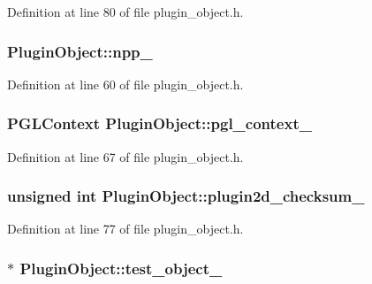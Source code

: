 Definition at line 80 of file plugin\_\-object.h.

\hypertarget{class_plugin_object_a73abf33dbc703aaab8c133b4fc16a6f4}{
\subsubsection[{npp\_\-}]{ {\bf PluginObject::npp\_\-}}}
\label{class_plugin_object_a73abf33dbc703aaab8c133b4fc16a6f4}


Definition at line 60 of file plugin\_\-object.h.

\hypertarget{class_plugin_object_a3819f8c68ea54fa3717c1487e288ee88}{
\subsubsection[{pgl\_\-context\_\-}]{\setlength{\rightskip}{0pt plus 5cm}PGLContext {\bf PluginObject::pgl\_\-context\_\-}}}
\label{class_plugin_object_a3819f8c68ea54fa3717c1487e288ee88}


Definition at line 67 of file plugin\_\-object.h.

\hypertarget{class_plugin_object_a1efe762777df7a3fc4b879d723598ef7}{
\subsubsection[{plugin2d\_\-checksum\_\-}]{\setlength{\rightskip}{0pt plus 5cm}unsigned int {\bf PluginObject::plugin2d\_\-checksum\_\-}}}
\label{class_plugin_object_a1efe762777df7a3fc4b879d723598ef7}


Definition at line 77 of file plugin\_\-object.h.

\hypertarget{class_plugin_object_aa643ef173ea31331094fbf809d87b70d}{
\subsubsection[{test\_\-object\_\-}]{$\ast$ {\bf PluginObject::test\_\-object\_\-}}}
\label{class_plugin_object_aa643ef173ea31331094fbf809d87b70d}


